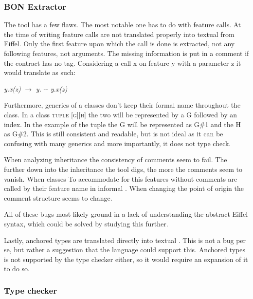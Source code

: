 \subsubsection{BON Extractor}
The \bon{ } tool has a few flaws. The most notable one has to do with feature calls. At the time of writing feature calls are not translated properly into textual \bon{ } from Eiffel. Only the first feature upon which the call is done is extracted, not any following features, not arguments. The missing information is put in a comment if the contract has no tag. Considering a call x on feature y with a parameter z it would translate as such:
\begin{center}
\textit{y.x(z)} $\rightarrow$ \textit{y.} -\-- \textit{y.x(z)}
\end{center}

Furthermore, generics of a classes don't keep their formal name throughout the class. In a class \textsc{tuple [g][h]} the two will be represented by a G followed by an index. In the example of the tuple the G will be represented as G\#1 and the H as G\#2. This is still consistent and readable, but is not ideal as it can be confusing with many generics and more importantly, it does not type check.

When analyzing inheritance the consistency of comments seem to fail. The further down into the inheritance the tool digs, the more the comments seem to vanish. When classes To accommodate for this features without comments are called by their feature name in informal \bon. When changing the point of origin the comment structure seems to change.

All of these bugs most likely ground in a lack of understanding the abstract Eiffel syntax, which could be solved by studying this further.

Lastly, anchored types are translated directly into textual \bon. This is not a bug per se, but rather a suggestion that the \bon{ } language could support this. Anchored types is not supported by the type checker either, so it would require an expansion of it to do so.
\subsubsection{Type checker}
